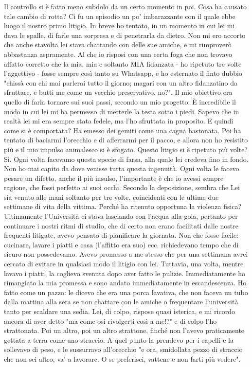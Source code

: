 \documentclass[a4paper,12pt]{article}
\newcommand{\Walter}{\speak{W}}
\newcommand{\Pollazzi}{\speak{P}}
\begin{document}
\begin{dialogue}
\Pollazzi Il controllo si è fatto meno subdolo da un certo momento in poi. Cosa ha causato tale cambio di rotta?
\Walter  Ci fu un episodio un po' imbarazzante con il quale ebbe luogo il nostro primo litigio. In breve ho tentato, in un momento in cui lei mi dava le spalle, di farle una sorpresa e di penetrarla da dietro. Non mi ero accorto che anche stavolta lei stava chattando con delle sue amiche, e mi rimproverò abbastanza aspramente. Al che io risposi con una certa foga che non trovavo affatto corretto che la mia, mia e soltanto MIA fidanzata - ho ripetuto tre volte l'aggettivo - fosse sempre così tanto su Whatsapp, e ho esternato il finto dubbio "chissà con chi mai parlerai tutto il giorno; magari con un altro fidanzatino da sfruttare, e butti me come un vecchio preservativo, no?". Il mio obiettivo era quello di farla tornare sui suoi passi, secondo un mio progetto. È incredibile il modo in cui lei mi ha permesso di metterle la testa sotto i piedi. Sapevo che in realtà lei mi era sempre stata fedele, ma l'ho sfruttata in proposito.
\Pollazzi E quindi come si è comportata?
\Walter  Ha emesso dei gemiti come una cagna bastonata. Poi ha tentato di baciarmi l'orecchio e di afferrarmi per il pacco, e allora non ho resistito più e il mio impulso animalesco si è sfogato.
\Pollazzi Questo litigio si è ripetuto più volte?
\Walter  Sì. Ogni volta facevamo questa specie di farsa, alla quale lei credeva fino in fondo. Non ho mai capito da dove venisse tutta questa ingenuità. Ogni volta le facevo pesare un difetto, anche il più insulso, l'importante è che io avessi sempre ragione, che fossi perfetto ai suoi occhi.
\Pollazzi Secondo la deposizione, sembra che Lei sia venuto alle mani soltanto per tre volte, coincidenti con le ultime due settimane di vita della vittima. Perché ha ritenuto opportuna la violenza fisica?
\Walter  Ultimamente l'Università ci stava lasciando con l'acqua alla gola, pertanto per continuare i nostri ritmi di studio, che di certo non erano facilitati dalle nostre frequenti litigate, avevo pensato di pianificare la giornata. Non che fosse facile: cucinare, lavare i piatti e casa (l'affitto era suo) ecc. richiedevano tempo che di sicuro non possedevamo. Avevo promesso a me stesso che per una settimana avrei cercato di evitare in qualsiasi modo il litigio con lei. Tuttavia, una volta, mentre lavavo i piatti, la coglievo svenuta dopo aver fatto le pulizie. Immediatamente ho rimangiato la mia promessa e sono andato immediatamente in escandescenza. Ho fatto come un pazzo: le dicevo che era una porca lavativa, che non faceva un tubo dalla mattina alla sera se non chattare con le amiche o frequentare l'università tanto per scaldare una sedia. Lei, di colpo, rispose quasi isterica, e mi ricordo ancora di aver detto "ma come osi rivolgerti così a me!?" e di colpo l'ho strattonata. Poi un altro, poi un altro strattone, finché non l'avevo praticamente gettata a terra come uno straccio. A quel punto la prendevo per i capelli e la sollevavo di peso, e le sussurravo all'orecchio "e ora, smidollata pezzo di straccio che non sei altro, va' a lavorare. O se preferisci, vattene e non farti più vedere".

\end{dialogue}
\end{document}
